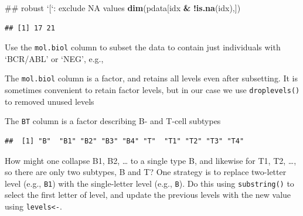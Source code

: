 \documentclass[]{article}
\newenvironment{Shaded}{\begin{snugshade}}{\end{snugshade}}
\newcommand{\KeywordTok}[1]{\textcolor[rgb]{0.13,0.29,0.53}{\textbf{#1}}}
\newcommand{\StringTok}[1]{\textcolor[rgb]{0.31,0.60,0.02}{#1}}
\newcommand{\OperatorTok}[1]{\textcolor[rgb]{0.81,0.36,0.00}{\textbf{#1}}}
\newcommand{\NormalTok}[1]{#1}
\theoremstyle{definition}
\theoremstyle{definition}
\theoremstyle{remark}
\begin{document}
\begin{Shaded}
\begin{Highlighting}[]
\NormalTok{## robust `[`: exclude NA values}
\KeywordTok{dim}\NormalTok{(pdata[idx }\OperatorTok{&}\StringTok{ }\OperatorTok{!}\KeywordTok{is.na}\NormalTok{(idx),])}
\end{Highlighting}
\end{Shaded}

\begin{verbatim}
## [1] 17 21
\end{verbatim}

Use the \texttt{mol.biol} column to subset the data to contain just
individuals with `BCR/ABL' or `NEG', e.g.,

\begin{Shaded}
\end{Shaded}

The \texttt{mol.biol} column is a factor, and retains all levels even
after subsetting. It is sometimes convenient to retain factor levels,
but in our case we use \texttt{droplevels()} to removed unused levels

\begin{Shaded}
\end{Shaded}

The \texttt{BT} column is a factor describing B- and T-cell subtypes

\begin{Shaded}
\end{Shaded}

\begin{verbatim}
##  [1] "B"  "B1" "B2" "B3" "B4" "T"  "T1" "T2" "T3" "T4"
\end{verbatim}

How might one collapse B1, B2, \ldots{} to a single type B, and likewise
for T1, T2, \ldots{}, so there are only two subtypes, B and T? One
strategy is to replace two-letter level (e.g., \texttt{B1}) with the
single-letter level (e.g., \texttt{B}). Do this using
\texttt{substring()} to select the first letter of level, and update the
previous levels with the new value using \texttt{levels\textless{}-}.
\end{document}
